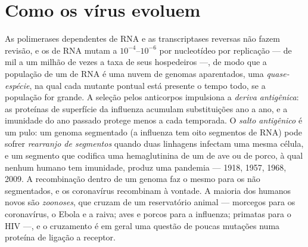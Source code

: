 \section{Como os vírus evoluem}

\begin{definition}\label{def:b3:virology:evolution}
As polimerases dependentes de RNA e as transcriptases reversas não
fazem revisão, e os  de RNA mutam a $10^{-4}$--$10^{-6}$ por
nucleotídeo por replicação --- de mil a um milhão de vezes a taxa de
seus hospedeiros ---, de modo que a população de um  de RNA é uma
nuvem de genomas aparentados, uma \emph{quase-espécie}, na qual cada
mutante pontual está presente o tempo todo, se a população for grande.
A seleção pelos anticorpos impulsiona a \emph{deriva antigênica}: as
proteínas de superfície da influenza acumulam substituições ano a ano,
e a imunidade do ano passado protege menos a cada temporada. O
\emph{salto antigênico} é um pulo: um genoma segmentado (a influenza
tem oito segmentos de RNA) pode sofrer \emph{rearranjo de segmentos}
quando duas linhagens infectam uma mesma célula, e um segmento que
codifica uma hemaglutinina de um  de ave ou de porco, à qual
nenhum humano tem imunidade, produz uma pandemia --- 1918, 1957, 1968,
2009. A recombinação dentro de um genoma faz o mesmo para os  não
segmentados, e os coronavírus recombinam à vontade. A maioria dos 
humanos novos são \emph{zoonoses}, que cruzam de um reservatório animal
--- morcegos para os coronavírus, o Ebola e a raiva; aves e porcos para
a influenza; primatas para o HIV ---, e o cruzamento é em geral uma
questão de poucas mutações numa proteína de ligação a receptor.
\end{definition}

